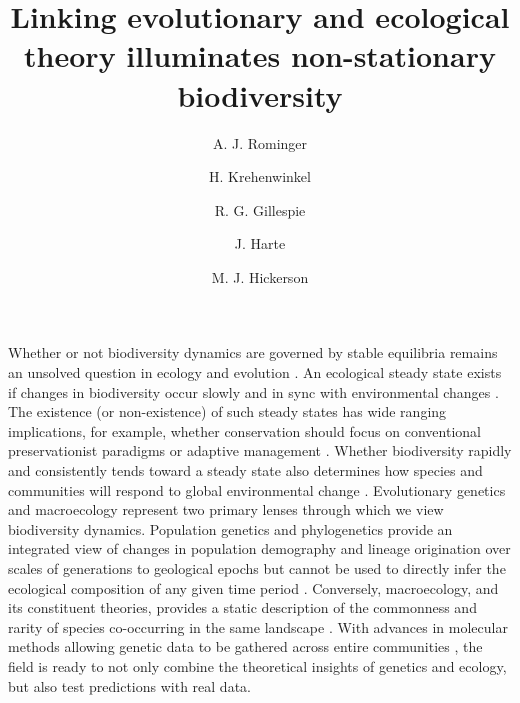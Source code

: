 \documentclass[12pt]{article}
\title{Linking evolutionary and ecological theory illuminates
  non-stationary biodiversity}
\author[1]{A. J. Rominger}
\author[1]{H. Krehenwinkel}
\author[1]{R. G. Gillespie}
\author[1]{J. Harte}
\author[2]{M. J. Hickerson}
\affil[1]{Department of Environmental Science, Policy and Management,
  University of California, Berkeley}
\affil[2]{Biology Department, City College of New York}
\date{}
\begin{document}
\maketitle

Whether or not biodiversity dynamics are governed by stable equilibria
remains an unsolved question in ecology and evolution
\citep{quental2013, rabosky2015amNat, harmon2015amNat}. An ecological
steady state exists if changes in biodiversity occur slowly and in
sync with environmental changes \citep{harteNewman}. The existence (or
non-existence) of such steady states has wide ranging implications,
for example, whether conservation should focus on conventional
preservationist paradigms or adaptive management \citep{levin1999}.
Whether biodiversity rapidly and consistently tends toward a steady
state also determines how species and communities will respond to
global environmental change \citep{barnosky2012}. Evolutionary
genetics \citep{nielsen2005, nei2010} and macroecology
\citep{brown1995} represent two primary lenses through which we view
biodiversity dynamics. Population genetics and phylogenetics provide
an integrated view of changes in population demography and lineage
origination over scales of generations to geological epochs but cannot
be used to directly infer the ecological composition of any given time
period \citep{quental2010}. Conversely, macroecology, and its
constituent theories, provides a static description of the commonness
and rarity of species co-occurring in the same landscape
\citep{hubbell2001, harteNewman}.  With advances in molecular methods
\citep{mccormack2013} allowing genetic data to be gathered across
entire communities \citep{gibson2014}, the field is
ready to not only combine the theoretical insights of genetics and
ecology, but also test predictions with real data.

\end{document}
